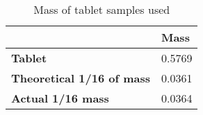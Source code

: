 \begin{table}[H]
    \centering
    \begin{tabular}{l|l}
\rowcolor[HTML]{FFC8F0} 
\textbf{} & \textbf{Mass} \\ \hline
\rowcolor[HTML]{FFE6F8} \textbf{Tablet}                   & 0.5769                                    \\
\rowcolor[HTML]{FFE6F8}\textbf{Theoretical 1/16 of mass} & 0.0361                                    \\
\rowcolor[HTML]{FFE6F8}\textbf{Actual 1/16 mass}         & 0.0364                                   
\end{tabular}

    \caption{Mass of tablet samples used}
    \label{tab:mass}
\end{table}